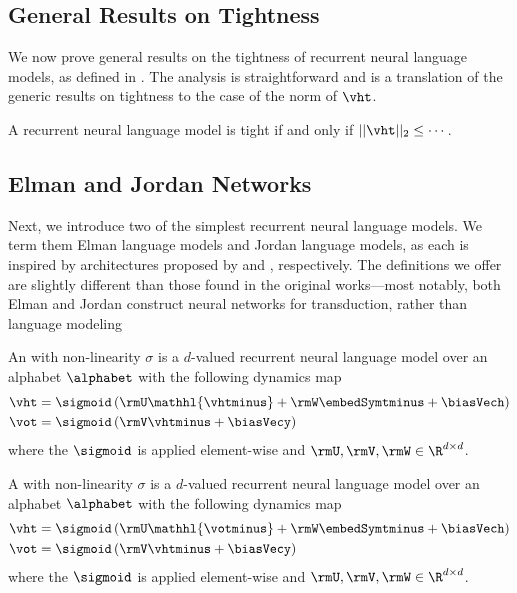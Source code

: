 \subsection{General Results on Tightness}
We now prove general results on the tightness of recurrent neural language models, as defined in .
The analysis is straightforward and is a translation of the generic results on tightness to the case of the norm of $\vht$.
\begin{theorem}
A recurrent neural language model is tight if and only if $||\vht||_2 \leq \cdots$.
\end{theorem}


\subsection{Elman and Jordan Networks}
Next, we introduce two of the simplest recurrent neural language models.
We term them Elman language models and Jordan language models, as each is inspired by architectures proposed by \citet{Elman1990} and \citet{Jordan1986}, respectively. 
The definitions we offer are slightly different than those found in the original works---most notably, both Elman and Jordan construct neural networks for transduction, rather than language modeling

\begin{definition}
An  with non-linearity $\sigma$ is a $d$-valued recurrent neural language model over an alphabet $\alphabet$ with the following dynamics map
\begin{align}
\vht &= \sigmoid\left(\rmU \mathhl{\vhtminus} + \rmW \embedSymtminus + \biasVech \right) \\
\vot &= \sigmoid\left(\rmV \vhtminus + \biasVecy \right)
\end{align}
where the $\sigmoid$ is applied element-wise and $\rmU,\rmV,\rmW \in \R^{d \times d}$. 
\end{definition}

\begin{definition}
A  with non-linearity $\sigma$ is a $d$-valued recurrent neural language model over an alphabet $\alphabet$ with the following dynamics map
\begin{align}
\vht &= \sigmoid\left(\rmU \mathhl{\votminus} + \rmW \embedSymtminus + \biasVech \right) \\
\vot &= \sigmoid\left(\rmV \vhtminus + \biasVecy \right)
\end{align}
where the $\sigmoid$ is applied element-wise and $\rmU,\rmV,\rmW \in \R^{d \times d}$. 
\end{definition}

